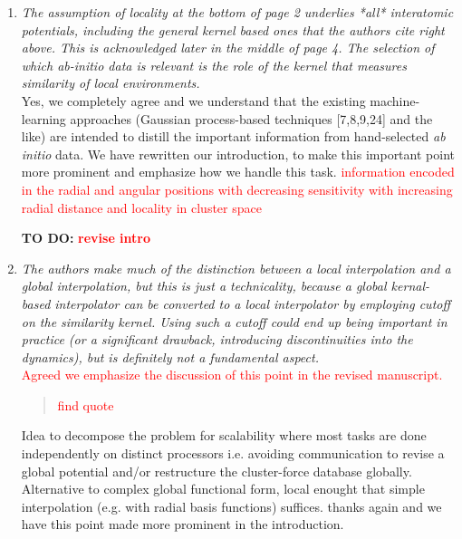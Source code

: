 \documentclass[11pt,twoside]{article}
\newcommand{\revise}[1]{\textcolor{red}{{#1}}} %
\newcommand{\todo}[1]{{\bf TO DO:} \textcolor{red}{\bf{#1}}}
\begin{document}
\begin{enumerate}
\item{\it
The assumption of locality at the bottom of page 2 underlies *all*
   interatomic potentials, including the general kernel based ones
   that the authors cite right above. This is acknowledged later in
   the middle of page 4. The selection of which ab-initio data is
   relevant is the role of the kernel that measures similarity of
   local environments.
}\\[0.1in]
Yes, we completely agree and we understand that the existing machine-learning approaches (Gaussian process-based techniques [7,8,9,24] and the like) are intended to distill the important information from hand-selected {\it ab initio} data. 
We have rewritten our introduction, to make this important point more prominent and emphasize how we handle this task.
\revise{information encoded in the radial and angular positions with decreasing sensitivity with increasing radial distance and locality in cluster space}

\todo{revise intro}

\item{\it
The authors make much of the distinction between a local
   interpolation and a global interpolation, but this is just a
   technicality, because a global kernal-based interpolator can be
   converted to a local interpolator by employing cutoff on the
   similarity kernel. Using such a cutoff could end up being important
   in practice (or a significant drawback, introducing discontinuities
   into the dynamics), but is definitely not a fundamental aspect.
}\\[0.1in]
\revise{
Agreed we emphasize the discussion of this point in the revised manuscript. 
}
\begin{quote}
\revise{find quote}
\end{quote}
Idea to decompose the problem for scalability where most tasks are done independently on distinct processors i.e. avoiding communication to revise a global potential and/or restructure the cluster-force database globally.
Alternative to complex global functional form, local enought that simple interpolation (e.g. with radial basis functions) suffices.
thanks again and we have this point made more prominent in the introduction.


\end{enumerate}
\end{document}
